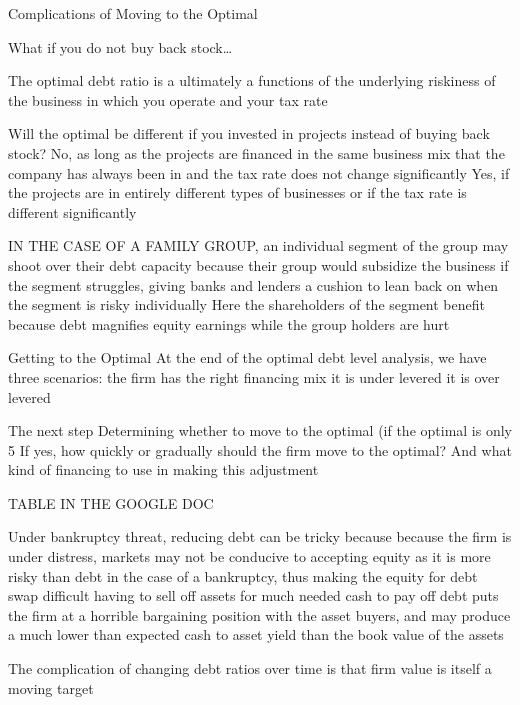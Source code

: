 \documentclass[10pt]{article}
\begin{document}
    \begin{core}{Complications of Moving to the Optimal}

      What if you do not buy back stock…

      The optimal debt ratio is a ultimately a functions of the underlying riskiness of the business in which you operate and your tax rate

      Will the optimal be different if you invested in projects instead of buying back stock?
      No, as long as the projects are financed in the same business mix that the company has always been in and the tax rate does not change significantly
      Yes, if the projects are in entirely different types of businesses or if the tax rate is different significantly

      IN THE CASE OF A FAMILY GROUP, an individual segment of the group may shoot over their debt capacity because their group would subsidize the business if the segment struggles, giving banks and lenders a cushion to lean back on when the segment is risky individually
      Here the shareholders of the segment benefit because debt magnifies equity earnings while the group holders are hurt


      Getting to the Optimal
      At the end of the optimal debt level analysis, we have three scenarios:
      the firm has the right financing mix
      it is under levered
      it is over levered

      The next step
      Determining whether to move to the optimal (if the optimal is only 5%
      If yes, how quickly or gradually should the firm move to the optimal?
      And what kind of financing to use in making this adjustment

      TABLE IN THE GOOGLE DOC

      Under bankruptcy threat, reducing debt can be tricky because
      because the firm is under distress, markets may not be conducive to accepting equity as it is more risky than debt in the case of a bankruptcy, thus making the equity for debt swap difficult
      having to sell off assets for much needed cash to pay off debt puts the firm at a horrible bargaining position with the asset buyers, and may produce a much lower than expected cash to asset yield than the book value of the assets

      The complication of changing debt ratios over time is that firm value is itself a moving target

    \end{core}
\end{document}
